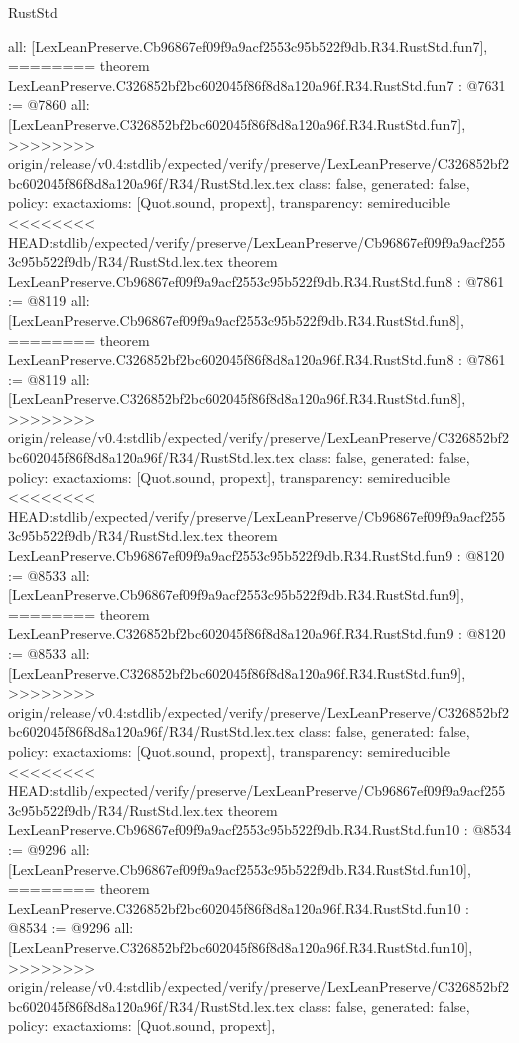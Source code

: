 \begin{lexlean}{RustStd}
\begin{coremodule}
{\begin{coremodule}
{{{{{{{{{{  all: [LexLeanPreserve.Cb96867ef09f9a9acf2553c95b522f9db.R34.RustStd.fun7],
========
theorem LexLeanPreserve.C326852bf2bc602045f86f8d8a120a96f.R34.RustStd.fun7 : @7631 := @7860 {
  all: [LexLeanPreserve.C326852bf2bc602045f86f8d8a120a96f.R34.RustStd.fun7],
>>>>>>>> origin/release/v0.4:stdlib/expected/verify/preserve/LexLeanPreserve/C326852bf2bc602045f86f8d8a120a96f/R34/RustStd.lex.tex
  class: false,
  generated: false,
  policy: exact{axioms: [Quot.sound, propext]},
  transparency: semireducible
}
<<<<<<<< HEAD:stdlib/expected/verify/preserve/LexLeanPreserve/Cb96867ef09f9a9acf2553c95b522f9db/R34/RustStd.lex.tex
theorem LexLeanPreserve.Cb96867ef09f9a9acf2553c95b522f9db.R34.RustStd.fun8 : @7861 := @8119 {
  all: [LexLeanPreserve.Cb96867ef09f9a9acf2553c95b522f9db.R34.RustStd.fun8],
========
theorem LexLeanPreserve.C326852bf2bc602045f86f8d8a120a96f.R34.RustStd.fun8 : @7861 := @8119 {
  all: [LexLeanPreserve.C326852bf2bc602045f86f8d8a120a96f.R34.RustStd.fun8],
>>>>>>>> origin/release/v0.4:stdlib/expected/verify/preserve/LexLeanPreserve/C326852bf2bc602045f86f8d8a120a96f/R34/RustStd.lex.tex
  class: false,
  generated: false,
  policy: exact{axioms: [Quot.sound, propext]},
  transparency: semireducible
}
<<<<<<<< HEAD:stdlib/expected/verify/preserve/LexLeanPreserve/Cb96867ef09f9a9acf2553c95b522f9db/R34/RustStd.lex.tex
theorem LexLeanPreserve.Cb96867ef09f9a9acf2553c95b522f9db.R34.RustStd.fun9 : @8120 := @8533 {
  all: [LexLeanPreserve.Cb96867ef09f9a9acf2553c95b522f9db.R34.RustStd.fun9],
========
theorem LexLeanPreserve.C326852bf2bc602045f86f8d8a120a96f.R34.RustStd.fun9 : @8120 := @8533 {
  all: [LexLeanPreserve.C326852bf2bc602045f86f8d8a120a96f.R34.RustStd.fun9],
>>>>>>>> origin/release/v0.4:stdlib/expected/verify/preserve/LexLeanPreserve/C326852bf2bc602045f86f8d8a120a96f/R34/RustStd.lex.tex
  class: false,
  generated: false,
  policy: exact{axioms: [Quot.sound, propext]},
  transparency: semireducible
}
<<<<<<<< HEAD:stdlib/expected/verify/preserve/LexLeanPreserve/Cb96867ef09f9a9acf2553c95b522f9db/R34/RustStd.lex.tex
theorem LexLeanPreserve.Cb96867ef09f9a9acf2553c95b522f9db.R34.RustStd.fun10 : @8534 := @9296 {
  all: [LexLeanPreserve.Cb96867ef09f9a9acf2553c95b522f9db.R34.RustStd.fun10],
========
theorem LexLeanPreserve.C326852bf2bc602045f86f8d8a120a96f.R34.RustStd.fun10 : @8534 := @9296 {
  all: [LexLeanPreserve.C326852bf2bc602045f86f8d8a120a96f.R34.RustStd.fun10],
>>>>>>>> origin/release/v0.4:stdlib/expected/verify/preserve/LexLeanPreserve/C326852bf2bc602045f86f8d8a120a96f/R34/RustStd.lex.tex
  class: false,
  generated: false,
  policy: exact{axioms: [Quot.sound, propext]},
}}}}}}}}}}}}}}
\end{coremodule}}
\end{coremodule}
\end{lexlean}
